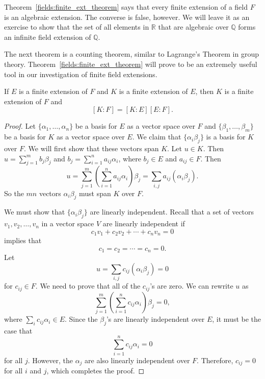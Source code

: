 \medskip


Theorem~\ref{fields:finite_ext_theorem} says that every finite extension of a field $F$ is an
algebraic extension. The converse is false, however. We will leave it
as an exercise to show that the set of all elements in ${\mathbb R}$ that
are algebraic over ${\mathbb Q}$ forms an infinite field extension of ${\mathbb
Q}$. 


\medskip


The next theorem is a counting theorem, similar to Lagrange's Theorem
in group theory. Theorem~\ref{fields:finite_ext_theorem} will prove to be an extremely useful
tool in our investigation of finite field extensions. 
 

\begin{theorem}\label{fields:tower_indices_theorem}
If $E$ is a finite extension of $F$ and $K$ is a finite extension of
$E$, then $K$ is a finite extension of $F$ and 
\[ 
[K:F]= [K:E] [E:F].
\]
\end{theorem}
 

\begin{proof}
Let $\{ \alpha_1, \ldots, \alpha_n \}$ be a basis for $E$ as a vector
space over $F$ and $\{ \beta_1, \ldots, \beta_m \}$ be a basis for
$K$ as a vector space over $E$. We claim that $\{ \alpha_i \beta_j
\}$ is a basis for $K$ over $F$.  
We will first show that these vectors span $K$. Let $u \in K$. Then $u
= \sum_{j=1}^{m} b_j \beta_j$ and $b_j = \sum_{i=1}^{n} a_{ij}
\alpha_i$, where $b_j \in E$ and $a_{ij} \in F$.	Then 
\[
u = \sum_{j=1}^{m} \left(  \sum_{i=1}^{n} a_{ij}
\alpha_i  \right) \beta_j = \sum_{i,j} a_{ij} ( \alpha_i
\beta_j ).
\]
So the $mn$ vectors $\alpha_i \beta_j$ must span $K$ over $F$. 


We must show that $\{ \alpha_i \beta_j \}$ are linearly independent.
Recall that a set of vectors $v_1, v_2, \ldots, v_n$ in a vector
space $V$ are linearly independent if 
\[
c_1 v_1 + c_2 v_2 + \cdots + c_n v_n = 0
\]
implies that
\[
c_1 = c_2 = \cdots = c_n = 0.
\]
Let 
\[
u = \sum_{i,j} c_{ij} ( \alpha_i \beta_j ) = 0
\]
for $c_{ij} \in F$. We need to prove that all of the $c_{ij}$'s are
zero. We can rewrite $u$ as
\[
\sum_{j=1}^{m} \left(  \sum_{i=1}^{n} c_{ij} \alpha_i
\right) \beta_j = 0,
\]
where $\sum_i c_{ij} \alpha_i \in E$.  Since the $\beta_j$'s are
linearly independent over $E$, it must be the case that 
\[
\sum_{i=1}^n c_{ij} \alpha_i = 0
\]
for all $j$. However, the $\alpha_j$ are also linearly independent 
over $F$.  Therefore, $c_{ij} = 0$ for all $i$ and $j$, which
completes the proof.
\end{proof}


